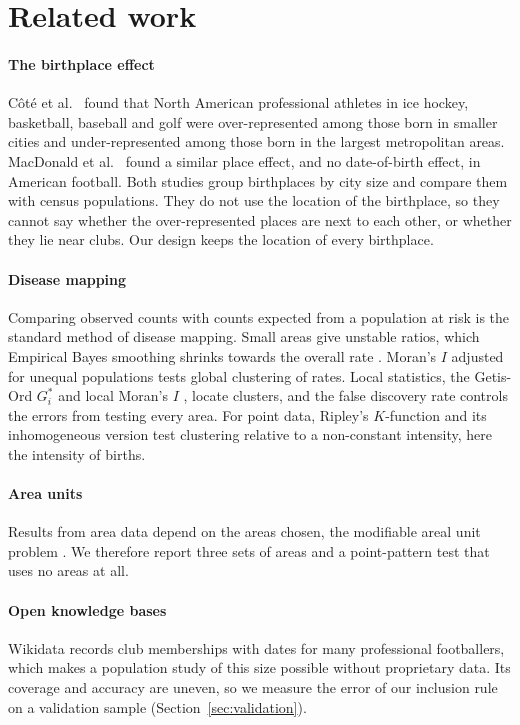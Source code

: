 \section{Related work}
\label{sec:related}

\paragraph{The birthplace effect} C\^ot\'e et al.\ \cite{cote2006} found that North American professional athletes in ice hockey, basketball, baseball and golf were over-represented among those born in smaller cities and under-represented among those born in the largest metropolitan areas. MacDonald et al.\ \cite{macdonald2009} found a similar place effect, and no date-of-birth effect, in American football. Both studies group birthplaces by city size and compare them with census populations. They do not use the location of the birthplace, so they cannot say whether the over-represented places are next to each other, or whether they lie near clubs. Our design keeps the location of every birthplace.

\paragraph{Disease mapping} Comparing observed counts with counts expected from a population at risk is the standard method of disease mapping. Small areas give unstable ratios, which Empirical Bayes smoothing shrinks towards the overall rate \cite{marshall1991}. Moran's $I$ adjusted for unequal populations \cite{assuncao1999} tests global clustering of rates. Local statistics, the Getis-Ord $G_i^*$ \cite{getis1992} and local Moran's $I$ \cite{anselin1995}, locate clusters, and the false discovery rate \cite{benjamini1995} controls the errors from testing every area. For point data, Ripley's $K$-function \cite{ripley1977} and its inhomogeneous version \cite{baddeley2000,baddeley2015} test clustering relative to a non-constant intensity, here the intensity of births.

\paragraph{Area units} Results from area data depend on the areas chosen, the modifiable areal unit problem \cite{openshaw1984}. We therefore report three sets of areas and a point-pattern test that uses no areas at all.

\paragraph{Open knowledge bases} Wikidata \cite{vrandecic2014} records club memberships with dates for many professional footballers, which makes a population study of this size possible without proprietary data. Its coverage and accuracy are uneven, so we measure the error of our inclusion rule on a validation sample (Section~\ref{sec:validation}).
